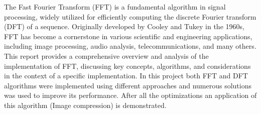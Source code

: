 The Fast Fourier Transform (FFT) is a fundamental algorithm in signal processing, widely utilized for efficiently computing the discrete Fourier transform (DFT) of a sequence. Originally developed by Cooley and Tukey in the 1960s, FFT has become a cornerstone in various scientific and engineering applications, including image processing, audio analysis, telecommunications, and many others. This report provides a comprehensive overview and analysis of the implementation of FFT, discussing key concepts, algorithms, and considerations in the context of a specific implementation. In this project both FFT and DFT algorithms were implemented using different approaches and numerous solutions was used to improve its performance. After all the optimizations an application of this algorithm (Image compression) is demonstrated.